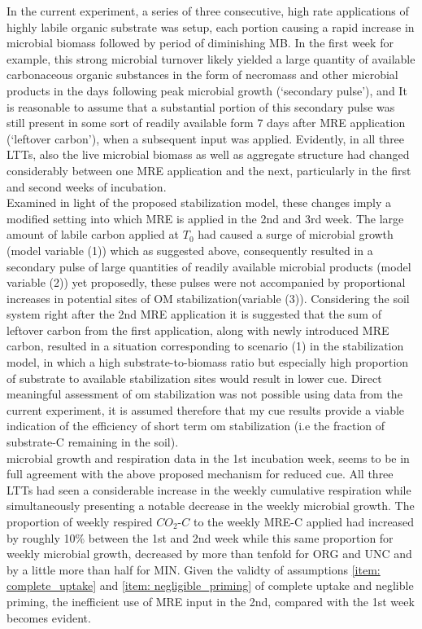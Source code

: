 	 In the current experiment, a series of three consecutive, high rate applications of highly labile organic substrate was setup, each portion causing a rapid increase in microbial biomass followed by period of diminishing MB. In the first week for example, this strong microbial turnover likely yielded a large quantity of available carbonaceous organic substances in the form of necromass and other microbial products in the days following peak microbial growth
	 (‘secondary pulse’),
 	 and It is reasonable to assume that a substantial portion of this secondary pulse was still present in some sort of readily available form 7 days after MRE application (‘leftover carbon’), when a subsequent input was applied.
 	 Evidently, in all three LTTs, also the live microbial biomass as well as  aggregate structure had changed considerably between one MRE application and the next, particularly in the first and second weeks of incubation.\\
	 Examined in light of the proposed stabilization model, these changes imply a modified setting into which MRE is applied in the 2nd and 3rd week. The large amount of labile carbon applied at $ T_0 $ had caused a surge of microbial growth (model variable (1)) which as suggested above, consequently resulted in a secondary pulse of large quantities of readily available microbial products (model variable (2)) yet proposedly, these pulses were not accompanied by proportional increases in potential sites of OM stabilization(variable (3)). Considering the soil system right after the 2nd MRE application it is suggested that the sum of leftover carbon from the first application, along with newly introduced MRE carbon, resulted in a situation corresponding to scenario (1) in the stabilization model,  in which a high substrate-to-biomass ratio but especially high proportion of substrate to available stabilization sites would result in lower \gls{cue}.
	 Direct meaningful  assessment of \gls{om} stabilization was not possible using data from the current experiment,
	 it is assumed therefore that my \gls{cue} results provide a viable indication of the efficiency of short term \gls{om} stabilization (i.e the fraction of substrate-C remaining in the soil).\\
	 microbial growth and respiration data in the 1st incubation week, seems to be in full agreement with the above proposed mechanism for reduced \gls{cue}. All three LTTs had seen a considerable increase in the weekly cumulative respiration while simultaneously presenting a notable decrease in the weekly microbial growth. The proportion of weekly respired $ CO_2 $-$ C $ to the weekly MRE-C applied had increased by roughly 10\% between the 1st and 2nd week while this same proportion for weekly microbial growth, decreased by more than tenfold for ORG and UNC and by a little more than half for MIN. Given the validty of assumptions \ref{item: complete_uptake} and \ref{item: negligible_priming} of complete uptake and neglible priming, the inefficient use of MRE input in the 2nd, compared with the 1st week becomes evident. \\
